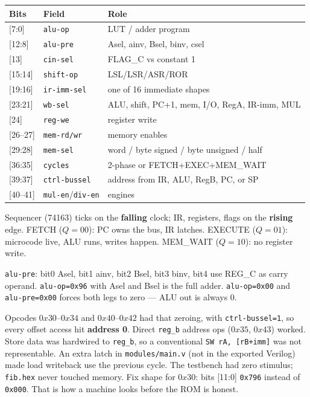 \documentclass[11pt,openany]{book}
\begin{document}
\begin{center}
\small
\begin{tabular}{@{}llp{6.8cm}@{}}
\toprule
Bits & Field & Role \\
\midrule
{[7:0]} & \texttt{alu-op} & LUT / adder program \\
{[12:8]} & \texttt{alu-pre} & Asel, ainv, Bsel, binv, csel \\
{[13]} & \texttt{cin-sel} & FLAG\_C vs constant 1 \\
{[15:14]} & \texttt{shift-op} & LSL/LSR/ASR/ROR \\
{[19:16]} & \texttt{ir-imm-sel} & one of 16 immediate shapes \\
{[23:21]} & \texttt{wb-sel} & ALU, shift, PC+1, mem, I/O, RegA, IR-imm, MUL \\
{[24]} & \texttt{reg-we} & register write \\
{[26--27]} & \texttt{mem-rd/wr} & memory enables \\
{[29:28]} & \texttt{mem-sel} & word / byte signed / byte unsigned / half \\
{[36:35]} & \texttt{cycles} & 2-phase or FETCH+EXEC+MEM\_WAIT \\
{[39:37]} & \texttt{ctrl-bussel} & address from IR, ALU, RegB, PC, or SP \\
{[40--41]} & \texttt{mul-en}/\texttt{div-en} & engines \\
\bottomrule
\end{tabular}
\end{center}

Sequencer (74163) ticks on the \textbf{falling} clock; IR, registers, flags on the \textbf{rising} edge. FETCH ($Q{=}00$): PC owns the bus, IR latches. EXECUTE ($Q{=}01$): microcode live, ALU runs, writes happen. MEM\_WAIT ($Q{=}10$): no register write.

\texttt{alu-pre}: bit0 Asel, bit1 ainv, bit2 Bsel, bit3 binv, bit4 use REG\_C as carry operand. \texttt{alu-op=0x96} with Asel and Bsel is the full adder. \texttt{alu-op=0x00} and \texttt{alu-pre=0x00} forces both legs to zero --- ALU out is always 0.

Opcodes $0x30$--$0x34$ and $0x40$--$0x42$ had that zeroing, with \texttt{ctrl-bussel=1}, so every offset access hit \textbf{address 0}. Direct \texttt{reg\_b} address ops ($0x35$, $0x43$) worked. Store data was hardwired to \texttt{reg\_b}, so a conventional \texttt{SW rA, [rB+imm]} was not representable. An extra latch in \texttt{modules/main.v} (not in the exported Verilog) made load writeback use the previous cycle. The testbench had zero stimulus; \texttt{fib.hex} never touched memory. Fix shape for $0x30$: bits [11:0] \texttt{0x796} instead of \texttt{0x000}. That is how a machine looks before the ROM is honest.
\end{document}
